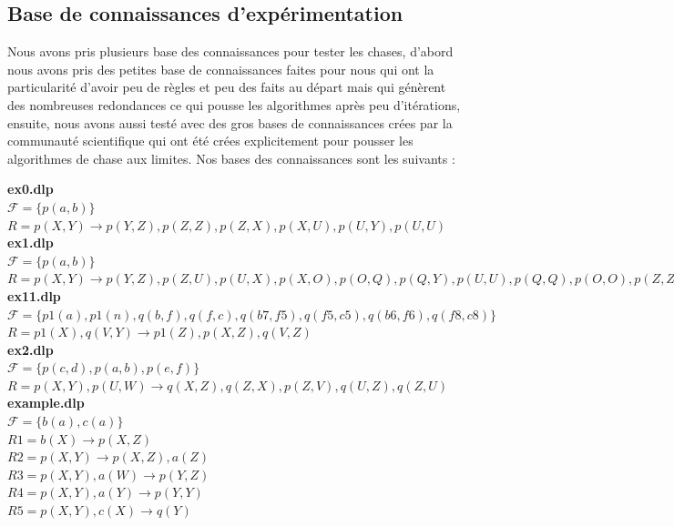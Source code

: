 \subsection{Base de connaissances d'expérimentation}

Nous avons pris plusieurs base des connaissances pour tester les chases, d'abord nous avons pris des petites base de connaissances faites pour nous qui ont la particularité d'avoir peu de règles et peu des faits au départ mais qui génèrent des nombreuses redondances ce qui pousse les algorithmes après peu d'itérations, ensuite, nous avons aussi testé avec des gros bases de connaissances crées par la communauté scientifique qui ont été crées explicitement pour pousser les algorithmes de chase aux limites. Nos bases des connaissances sont les suivants : 

\vspace{10pt}
\textbf{ex0.dlp}\\
$\mathcal{F} = \{p(a,b)\}$ \\
$R = p(X,Y) \rightarrow p(Y,Z), p(Z,Z), p(Z,X), p(X,U), p(U,Y), p(U,U)$\\

\textbf{ex1.dlp}\\
$\mathcal{F} = \{p(a,b)\}$ \\
$R = p(X,Y) \rightarrow p(Y,Z), p(Z,U), p(U,X), p(X,O), p(O,Q), p(Q,Y), p(U,U), p(Q,Q), p(O,O), p(Z,Z)$\\

\textbf{ex11.dlp}\\
$\mathcal{F} = \{p1(a), p1(n),q(b,f),q(f,c),q(b7,f5),q(f5,c5),q(b6,f6),q(f8,c8)\}$ \\
$R = p1(X), q(V,Y) \rightarrow p1(Z),p(X,Z),q(V,Z)$\\

\textbf{ex2.dlp}\\
$\mathcal{F} = \{p(c,d), p(a,b), p(e,f)\}$ \\
$R = p(X,Y), p(U,W) \rightarrow q(X,Z), q(Z,X), p(Z,V), q(U,Z), q(Z,U)$\\

\textbf{example.dlp}\\
$\mathcal{F} = \{b(a), c(a)\}$\\
$R1 = b(X) \rightarrow p(X,Z)$\\
$R2 = p(X,Y) \rightarrow p(X,Z), a(Z)$\\
$R3 = p(X,Y), a(W) \rightarrow p(Y,Z)$\\
$R4 = p(X,Y), a(Y) \rightarrow p(Y,Y)$\\
$R5 = p(X,Y), c(X) \rightarrow q(Y)$

